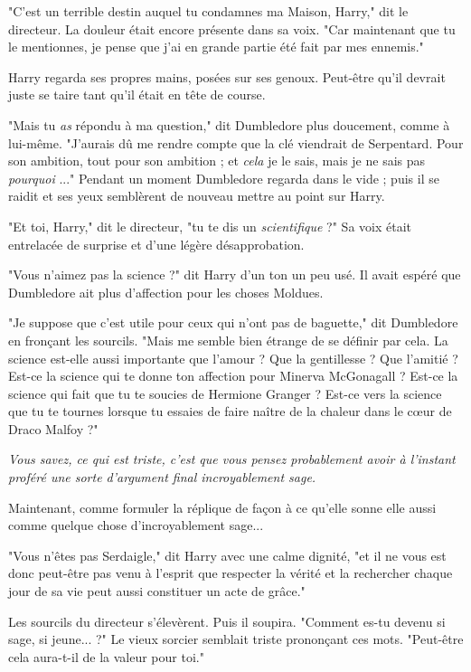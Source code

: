 "C'est un terrible destin auquel tu condamnes ma Maison, Harry," dit le directeur. La douleur était encore présente dans sa voix. "Car maintenant que tu le mentionnes, je pense que j'ai en grande partie été fait par mes ennemis."

Harry regarda ses propres mains, posées sur ses genoux. Peut-être qu'il devrait juste se taire tant qu'il était en tête de course.

"Mais tu \emph{as}  répondu à ma question," dit Dumbledore plus doucement, comme à lui-même. "J'aurais dû me rendre compte que la clé viendrait de Serpentard. Pour son ambition, tout pour son ambition ; et \emph{cela}  je le sais, mais je ne sais pas \emph{pourquoi} ..." Pendant un moment Dumbledore regarda dans le vide ; puis il se raidit et ses yeux semblèrent de nouveau mettre au point sur Harry.

"Et toi, Harry," dit le directeur, "tu te dis un \emph{scientifique}  ?" Sa voix était entrelacée de surprise et d'une légère désapprobation.

"Vous n'aimez pas la science ?" dit Harry d'un ton un peu usé. Il avait espéré que Dumbledore ait plus d'affection pour les choses Moldues.

"Je suppose que c'est utile pour ceux qui n'ont pas de baguette," dit Dumbledore en fronçant les sourcils. "Mais me semble bien étrange de se définir par cela. La science est-elle aussi importante que l'amour ? Que la gentillesse ? Que l'amitié ? Est-ce la science qui te donne ton affection pour Minerva McGonagall ? Est-ce la science qui fait que tu te soucies de Hermione Granger ? Est-ce vers la science que tu te tournes lorsque tu essaies de faire naître de la chaleur dans le cœur de Draco Malfoy ?"

\emph{Vous savez, ce qui est triste, c'est que vous pensez probablement avoir à l'instant proféré une sorte d'argument final incroyablement sage.} 

Maintenant, comme formuler la réplique de façon à ce qu'elle sonne elle aussi comme quelque chose d'incroyablement sage...

"Vous n'êtes pas Serdaigle," dit Harry avec une calme dignité, "et il ne vous est donc peut-être pas venu à l'esprit que respecter la vérité et la rechercher chaque jour de sa vie peut aussi constituer un acte de grâce."

Les sourcils du directeur s'élevèrent. Puis il soupira. "Comment es-tu devenu si sage, si jeune... ?" Le vieux sorcier semblait triste prononçant ces mots. "Peut-être cela aura-t-il de la valeur pour toi."

